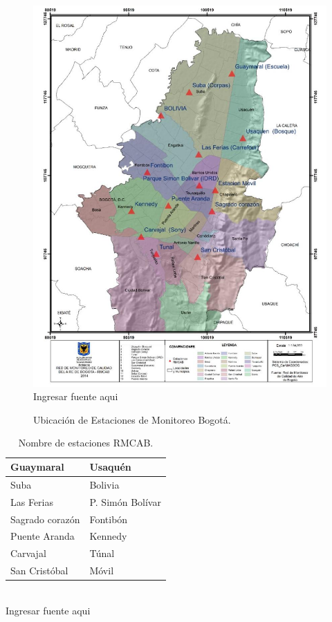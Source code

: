 \documentclass[a4paper,openright,12pt]{book}
\theoremstyle{definition}
\theoremstyle{remark}
\begin{document}
\begin{figure}[htbp]
\centering
\caption{Ubicación de Estaciones de Monitoreo Bogotá.} 
\includegraphics[scale=0.31]{Ubicacion_RMCAB}
\\Ingresar fuente aqui
\label{fig:Ubicacion}
\end{figure}

\begin{table}[htb]
\centering
\caption{Nombre de estaciones RMCAB.}
\resizebox{5cm}{!} {
\begin{tabular}{|l|l|}
\hline
Guaymaral & Usaquén \\ \hline
Suba & Bolivia \\ \hline
Las Ferias & P. Simón Bolívar \\ \hline
Sagrado corazón & Fontibón \\ \hline
Puente Aranda & Kennedy \\ \hline
Carvajal & Túnal \\ \hline
San Cristóbal & Móvil \\ \hline
\end{tabular}
}
\\Ingresar fuente aqui
\label{tabla:RMCAB1}
\end{table}
\end{document}
